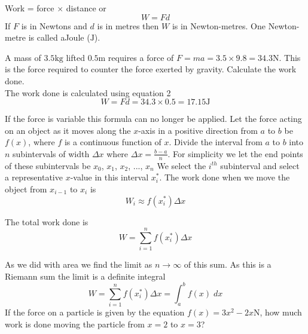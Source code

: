 Work = force $ \times $ distance or
\begin{equation}W =F d\tag{2}
\end{equation}If $F$ is in Newtons and $d$ is in metres then $W$ is in Newton-metres. One Newton-metre is called a\linebreak\relax Joule
($\mbox{J}$). 

\example A mass of $3.5 \mbox{kg}$ lifted $0.5 \mbox{m}$ requires a force of $\displaystyle F =m a =3.5 \times 9.8 =34.3 \mbox{N}$. This is the force required to counter the force exerted by gravity. Calculate the work done.\\
\solution The work done is calculated using equation 2
\begin{equation*}W =F d =34.3 \times 0.5 =17.15 \mbox{J}
\end{equation*}

If the force is variable this formula can no longer be applied. Let
the force acting on an object as it moves along the $x$-axis in a positive direction from $a$ to $b$ be $f (x)$, where $f$ is a continuous function of $x$. Divide the interval from $a$ to $b$ into $n$ subintervals of width $ \Delta x$ where $ \Delta x =\frac{b -a}{n}$. For
simplicity we let the end points of these subintervals be $x_{0}$, $x_{1}$, $x_{2}$, ..., $x_{n}$ We select the $i^{t h}$ subinterval and select a representative $x$-value in this interval $x_{i}^{ \ast }$. The work done when we move the object from $x_{i -1}$ to $x_{i}$ is
\begin{equation*}W_{i} \approx f (x_{i}^{ \ast })  \Delta x
\end{equation*}

The total work done is
\begin{equation}W =\sum _{i =1}^{n}f (x_{i}^{ \ast })  \Delta x\tag{3}
\end{equation}

As we did with area we find the limit as $n \rightarrow \infty $ of this sum. As this is a Riemann sum the limit is a definite integral
\begin{equation}W =\sum _{i =1}^{n}f (x_{i}^{ \ast })  \Delta x =\int _{a}^{b}f (x)\; d x\tag{4}
\end{equation}
\example If the force on a particle is given by the equation $f (x) =3 x^{2} -2 x \mbox{N}$, how much work is done moving the particle from $x =2$ to $x =3$?

